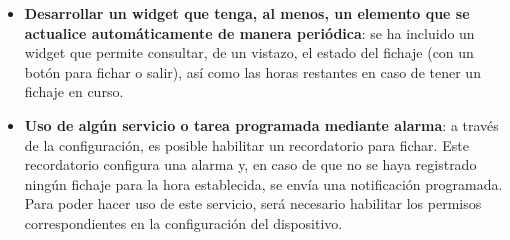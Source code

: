\begin{itemize}
    \item \textbf{Desarrollar un widget que tenga, al menos, un elemento que se actualice automáticamente de manera periódica}: se ha incluido un widget que permite consultar, de un vistazo, el estado del fichaje (con un botón para fichar o salir), así como las horas restantes en caso de tener un fichaje en curso.
    \item \textbf{Uso de algún servicio o tarea programada mediante alarma}: a través de la configuración, es posible habilitar un recordatorio para fichar. Este recordatorio configura una alarma y, en caso de que no se haya registrado ningún fichaje para la hora establecida, se envía una notificación programada. Para poder hacer uso de este servicio, será necesario habilitar los permisos correspondientes en la configuración del dispositivo.
\end{itemize}